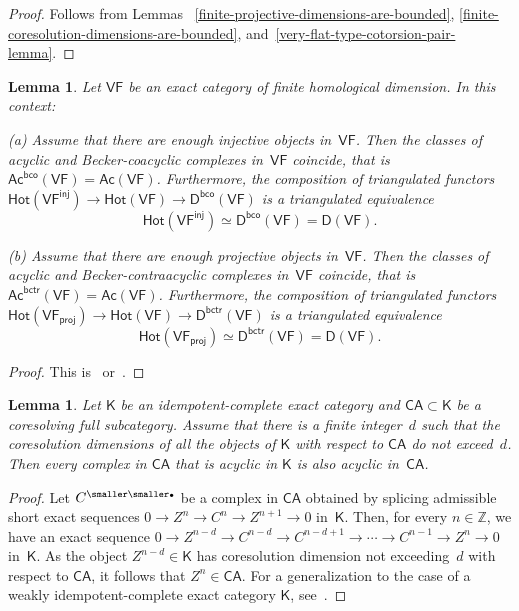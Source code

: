 \documentclass[12pt,a4paper]{amsart}
\newcommand{\+}{\nobreakdash-}
\renewcommand{\:}{\colon}
\newcommand{\rarrow}{\longrightarrow}
\newcommand{\bu}{{\text{\smaller\smaller$\scriptstyle\bullet$}}}
\newcommand{\sD}{\mathsf D}
\newcommand{\sK}{\mathsf K}
\newcommand{\VF}{\mathsf{VF}}
\newcommand{\CA}{\mathsf{CA}}
\newcommand{\Hot}{\mathsf{Hot}}
\newcommand{\Ac}{\mathsf{Ac}}
\newcommand{\proj}{\mathsf{proj}}
\newcommand{\inj}{\mathsf{inj}}
\newcommand{\bco}{\mathsf{bco}}
\newcommand{\bctr}{\mathsf{bctr}}
\newcommand{\boZ}{\mathbb Z}
\theoremstyle{plain}
\newtheorem{lem}[thm]{Lemma}
\theoremstyle{definition}
\begin{document}
\begin{proof}
 Follows from
Lemmas~	\ref{finite-projective-dimensions-are-bounded},
\ref{finite-coresolution-dimensions-are-bounded},
and~\ref{very-flat-type-cotorsion-pair-lemma}.
\end{proof}

\begin{lem} \label{exact-category-of-finite-homol-dim}
 Let\/ $\VF$ be an exact category of finite homological dimension.
 In this context: \par
\textup{(a)} Assume that there are enough injective objects in\/~$\VF$.  
 Then the classes of acyclic and Becker-coacyclic complexes in\/~$\VF$
coincide, that is\/ $\Ac^\bco(\VF)=\Ac(\VF)$.
 Furthermore, the composition of triangulated functors\/
$\Hot(\VF^\inj)\rarrow\Hot(\VF)\rarrow\sD^\bco(\VF)$ is a triangulated
equivalence
$$
 \Hot(\VF^\inj)\simeq\sD^\bco(\VF)=\sD(\VF).
$$ \par
\textup{(b)} Assume that there are enough projective objects in\/~$\VF$.
 Then the classes of acyclic and Becker-contraacyclic complexes
in\/~$\VF$ coincide, that is\/ $\Ac^\bctr(\VF)=\Ac(\VF)$.
 Furthermore, the composition of triangulated functors\/
$\Hot(\VF_\proj)\rarrow\Hot(\VF)\rarrow\sD^\bctr(\VF)$ is a triangulated
equivalence
$$
 \Hot(\VF_\proj)\simeq\sD^\bctr(\VF)=\sD(\VF).
$$
\end{lem}

\begin{proof}
 This is~\cite[Proposition~7.5]{Pphil}
or~\cite[Theorem~B.7.6]{Pcosh}.
\end{proof}

\begin{lem} \label{finite-coresol-dim-periodicity}
 Let\/ $\sK$ be an idempotent-complete exact category and\/
$\CA\subset\sK$ be a coresolving full subcategory.
 Assume that there is a finite integer~$d$ such that the coresolution
dimensions of all the objects of\/ $\sK$ with respect to\/ $\CA$ do
not exceed~$d$.
 Then every complex in\/ $\CA$ that is acyclic in\/ $\sK$ is also
acyclic in\/~$\CA$.
\end{lem}

\begin{proof}
 Let $C^\bu$ be a complex in $\CA$ obtained by splicing admissible
short exact sequences $0\rarrow Z^n\rarrow C^n\rarrow Z^{n+1}\rarrow0$
in~$\sK$.
 Then, for every $n\in\boZ$, we have an exact sequence
$0\rarrow Z^{n-d}\rarrow C^{n-d}\rarrow C^{n-d+1}\rarrow\dotsb
\rarrow C^{n-1}\rarrow Z^n\rarrow0$ in~$\sK$.
 As the object $Z^{n-d}\in\sK$ has coresolution dimension not
exceeding~$d$ with respect to $\CA$, it follows that $Z^n\in\CA$.
 For a generalization to the case of a weakly idempotent-complete
exact category\/ $\sK$, see~\cite[Corollary~A.5.4]{Pcosh}.
\end{proof}
\end{document}
